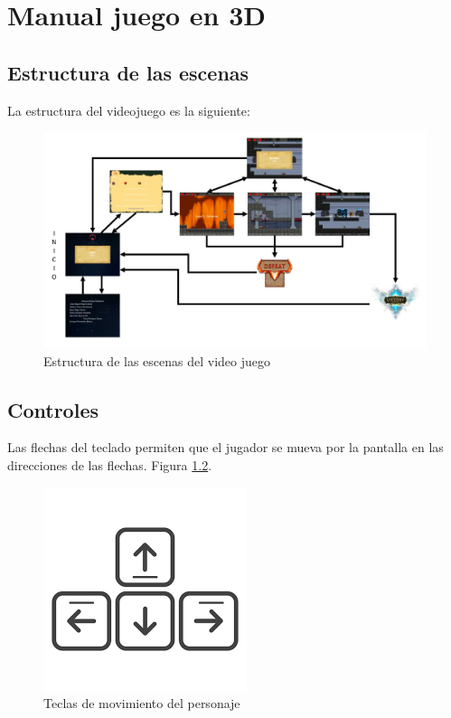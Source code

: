 \chapter{Manual juego en 3D}

\section{Estructura de las escenas}

La estructura del videojuego es la siguiente: 

\begin{figure}[H]
	\centering
	\includegraphics[scale=0.50]{imagenes/Estructura_escena.png}
	\caption{\label{fig:Estructura_escena}Estructura de las escenas del video juego}
\end{figure}

\section{Controles}

Las flechas del teclado permiten que el jugador se mueva por la pantalla en las direcciones de las flechas. Figura \ref{fig:flechasTeclado}.

\begin{figure}[H]
	\centering
	\includegraphics[scale=0.50]{imagenes/flechas_teclado.png}
	\caption{\label{fig:flechasTeclado}Teclas de movimiento del personaje}
\end{figure}

